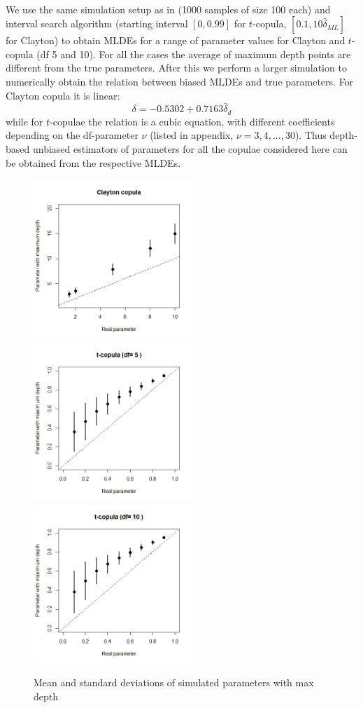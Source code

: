 \documentclass[11pt]{llncs}
\begin{document}
\paragraph{}We use the same simulation setup as in \cite{copdepth}(1000 samples of size 100 each) and interval search algorithm (starting interval $[0,0.99]$ for $t$-copula, $[0.1,10\hat\delta_{ML}]$ for Clayton) to obtain MLDEs for a range of parameter values for Clayton and $t$-copula (df 5 and 10). For all the cases the average of maximum depth points are different from the true parameters. After this we perform a larger simulation to numerically obtain the relation between biased MLDEs and true parameters. For Clayton copula it is linear:
$$ \delta = -0.5302 + 0.7163\hat\delta_d $$
while for $t$-copulae the relation is a cubic equation, with different coefficients depending on the df-parameter $\nu$ (listed in appendix, $\nu = 3,4,...,30$). Thus depth-based unbiased estimators of parameters for all the copulae considered  here can be obtained from the respective MLDEs.

\begin{figure}[t]
	\centering
		\includegraphics[height=6cm]{CopDepth_Clay.png}\\
		\includegraphics[height=6cm]{CopDepth_t5.png}
		\includegraphics[height=6cm]{CopDepth_t10.png}
	\label{fig:fig1}
	\caption{Mean and standard deviations of simulated parameters with max depth}
\end{figure}
 
\end{document}
